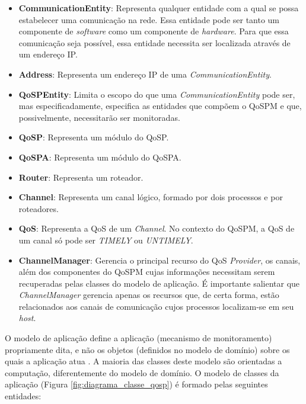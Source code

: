 \begin{itemize}
\item \textbf{CommunicationEntity}: Representa qualquer entidade com a qual se possa estabelecer uma comunicação na rede. Essa entidade pode ser tanto um componente de \textit{software} como um componente de \textit{hardware}. Para que essa comunicação seja possível, essa entidade necessita ser localizada através de um endereço IP.

\item \textbf{Address}: Representa um endereço IP de uma \textit{CommunicationEntity}.

\item \textbf{QoSPEntity}: Limita o escopo do que uma \textit{CommunicationEntity} pode ser, mas especificadamente, especifica as entidades que compõem o QoSPM e que, possivelmente, necessitarão ser monitoradas.

\item \textbf{QoSP}: Representa um módulo do QoSP.

\item \textbf{QoSPA}: Representa um módulo do QoSPA.

\item \textbf{Router}: Representa um roteador.

\item \textbf{Channel}: Representa um canal lógico, formado por dois processos e por roteadores.

\item \textbf{QoS}: Representa a QoS de um \textit{Channel}. No contexto do QoSPM, a QoS de um canal só pode ser \textit{TIMELY} ou \textit{UNTIMELY}.

\item \textbf{ChannelManager}: Gerencia o principal recurso do QoS \textit{Provider}, os canais, além dos componentes do QoSPM cujas informações necessitam serem recuperadas pelas classes do modelo de aplicação. É importante salientar que \textit{ChannelManager} gerencia apenas os recursos que, de certa forma, estão relacionados aos canais de comunicação cujos processos localizam-se em seu \textit{host}.	
\end{itemize}
	
	O modelo de aplicação define a aplicação (mecanismo de monitoramento) propriamente dita, e não os objetos (definidos no modelo de domínio) sobre os quais a aplicação atua \cite{BLAHUM06}. A maioria das classes deste modelo são orientadas a computação, diferentemente do modelo de domínio. O modelo de classes da aplicação (Figura \ref{fig:diagrama_classe_qosp}) é formado pelas seguintes entidades:
	
